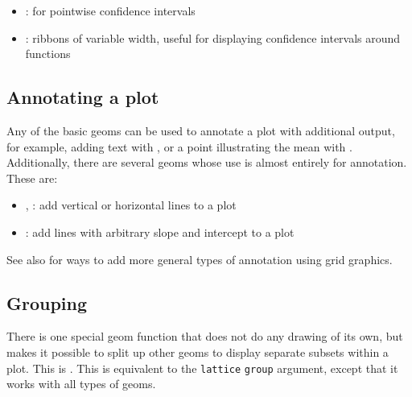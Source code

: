 \begin{itemize}
	\item {}: for pointwise confidence intervals
	\item {}: ribbons of variable width, useful for displaying confidence intervals around functions
\end{itemize}

\subsection{Annotating a plot}\label{sub:annotating_a_plot}

Any of the basic geoms can be used to annotate a plot with additional output, for example, adding text with , or a point illustrating the mean with .  Additionally, there are several geoms whose use is almost entirely for annotation.  These are:

\begin{itemize}
	\item {}, : add vertical or horizontal lines to a plot
	\item {}: add lines with arbitrary slope and intercept to a plot
\end{itemize}

See also  for ways to add more general types of annotation using grid graphics.

\subsection{Grouping}\label{sub:grouping}

There is one special geom function that does not do any drawing of its own, but makes it possible to split up other geoms to display separate subsets within a plot.  This is .  This is equivalent to the {\tt lattice} {\tt group} argument, except that it works with all types of geoms.  

